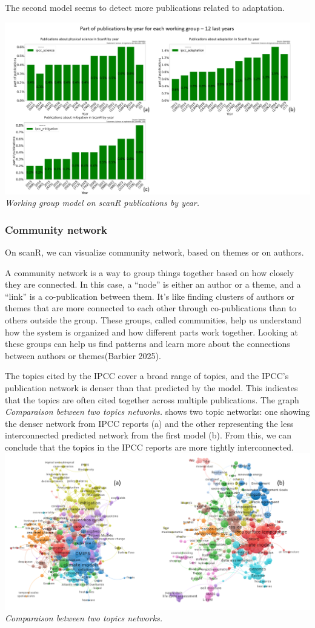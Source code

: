 \documentclass[
]{article}
\begin{document}
The second model seems to detect more publications related to
adaptation.

\includegraphics{./images/teds_model_scanR_wg.png} \emph{Working group
model on scanR publications by year.}

\hypertarget{community-network}{%
\subsubsection{Community network}\label{community-network}}

On scanR, we can visualize community network, based on themes or on
authors.

A community network is a way to group things together based on how
closely they are connected. In this case, a ``node'' is either an author
or a theme, and a ``link'' is a co-publication between them. It's like
finding clusters of authors or themes that are more connected to each
other through co-publications than to others outside the group. These
groups, called communities, help us understand how the system is
organized and how different parts work together. Looking at these groups
can help us find patterns and learn more about the connections between
authors or themes(Barbier 2025).

The topics cited by the IPCC cover a broad range of topics, and the
IPCC's publication network is denser than that predicted by the model.
This indicates that the topics are often cited together across multiple
publications. The graph \emph{Comparaison between two topics networks.}
shows two topic networks: one showing the denser network from IPCC
reports (a) and the other representing the less interconnected predicted
network from the first model (b). From this, we can conclude that the
topics in the IPCC reports are more tightly interconnected.
\includegraphics{./images/teds_network_topics2.png} \emph{Comparaison
between two topics networks.}
\end{document}
